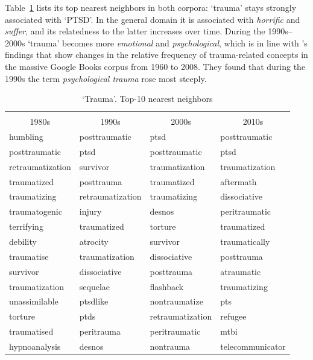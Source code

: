 \documentclass[output=paper]{langsci/langscibook}
\begin{document}
Table~\ref{tab:trauma-nns} lists its top nearest neighbors in both corpora: `trauma' stays strongly associated with `PTSD'. In the general domain it is associated with \textit{horrific} and \textit{suffer}, and its relatedness to the latter increases over time. During the 1990s--2000s `trauma' becomes more \textit{emotional} and \textit{psychological}, which is in line with \citet{haslam2020concept}'s findings that show
changes in the relative frequency of trauma-related concepts in the massive Google Books corpus from 1960 to 2008. They found that during the 1990s the term \textit{psychological trauma} rose most steeply. 

\begin{table}
\footnotesize
\caption{`Trauma'. Top-10 nearest neighbors\label{tab:trauma-nns}}
\begin{tabular}{llll}
\lsptoprule
\multicolumn{4}{c}{Psychology}\\
\multicolumn{1}{c}{1980s} & \multicolumn{1}{c}{1990s}  & \multicolumn{1}{c}{2000s} & \multicolumn{1}{c}{2010s}\\\midrule
humbling&posttraumatic&ptsd&posttraumatic              \\   
posttraumatic&ptsd&posttraumatic&ptsd                  \\   
retraumatization&survivor&traumatization&traumatization\\   
traumatized&posttrauma&traumatized&aftermath           \\   
traumatizing&retraumatization&traumatizing&dissociative\\   
traumatogenic&injury&desnos&peritraumatic              \\   
terrifying&traumatized&torture&traumatized             \\   
debility&atrocity&survivor&traumatically               \\   
traumatise&traumatization&dissociative&posttrauma      \\   
survivor&dissociative&posttrauma&atraumatic            \\   
traumatization&sequelae&flashback&traumatizing         \\   
unassimilable&ptsdlike&nontraumatize&pts               \\   
torture&ptds&retraumatization&refugee                  \\   
traumatised&peritrauma&peritraumatic&mtbi              \\   
hypnoanalysis&desnos&nontrauma&telecommunicator        \\   

\end{tabular}
\end{table}
\end{document}
